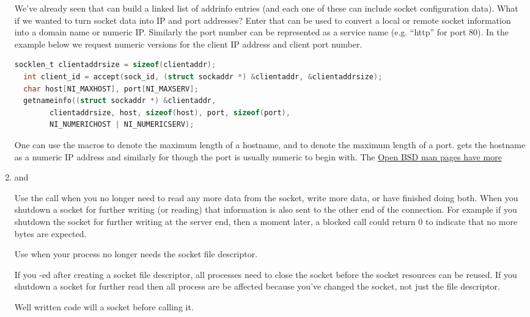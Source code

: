 \begin{enumerate}
  We've already seen  that can build a linked list of addrinfo entries (and each one of these can include socket configuration data).
  What if we wanted to turn socket data into IP and port addresses? Enter  that can be used to convert a local or remote socket information into a domain name or numeric IP.
  Similarly the port number can be represented as a service name (e.g.
  ``http'' for port 80).
  In the example below we request numeric versions for the client IP address and client port number.

  \begin{lstlisting}[language=C]
  socklen_t clientaddrsize = sizeof(clientaddr);
  int client_id = accept(sock_id, (struct sockaddr *) &clientaddr, &clientaddrsize);
  char host[NI_MAXHOST], port[NI_MAXSERV];
  getnameinfo((struct sockaddr *) &clientaddr,
        clientaddrsize, host, sizeof(host), port, sizeof(port),
        NI_NUMERICHOST | NI_NUMERICSERV);
  \end{lstlisting}

  One can use the macros  to denote the maximum length of a hostname, and  to denote the maximum length of  a port.  gets the hostname as a numeric IP address and similarly for  though the port is usually numeric to begin with. The \href{https://man.openbsd.org/getnameinfo.3#NI\_NUMERICHOST}{Open BSD man pages have more}

  \item {} and 

  Use the  call when you no longer need to read any more data from the socket, write more data, or have finished doing both.
  When you shutdown a socket for further writing (or reading) that information is also sent to the other end of the connection.
  For example if you shutdown the socket for further writing at the server end, then a moment later, a blocked  call could return 0 to indicate that no more bytes are expected.

  Use  when your process no longer needs the socket file descriptor.

  If you -ed after creating a socket file descriptor, all processes need to close the socket before the socket resources can be reused.
  If you shutdown a socket for further read then all process are be affected because you've changed the socket, not just the file descriptor.

  Well written code will  a socket before calling  it.


\end{enumerate}

